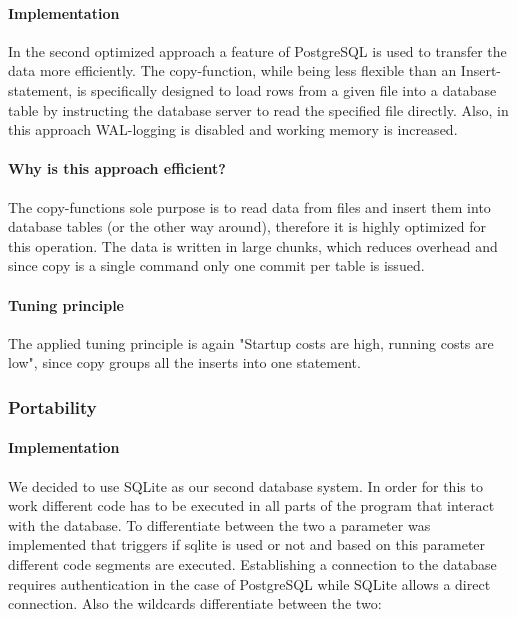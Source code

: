 \documentclass[11pt]{scrartcl}
\begin{document}
\paragraph{Implementation}

In the second optimized approach a feature of PostgreSQL is used to transfer the data more efficiently. The copy-function, while being less flexible than an Insert-statement, is specifically designed to load rows from a given file into a database table by instructing the database server to read the specified file directly. Also, in this approach WAL-logging is disabled and working memory is increased.

\paragraph{Why is this approach efficient?}

The copy-functions sole purpose is to read data from files and insert them into database tables (or the other way around), therefore it is highly optimized for this operation. The data is written in large chunks, which reduces overhead and since copy is a single command only one commit per table is issued. 

\paragraph{Tuning principle}

The applied tuning principle is again "Startup costs are high, running costs are low", since copy groups all the inserts into one statement.

\subsubsection*{Portability}

\paragraph{Implementation}

We decided to use SQLite as our second database system. In order for this to work different code has to be executed in all parts of the program that interact with the database. To differentiate between the two a parameter was implemented that triggers if sqlite is used or not and based on this parameter different code segments are executed. Establishing a connection to the database requires authentication in the case of PostgreSQL while SQLite allows a direct connection. Also the wildcards differentiate between the two:
\end{document}
